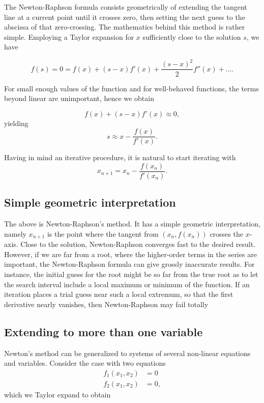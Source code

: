 \documentclass[%
oneside,                 %
final,                   %
10pt]{article}
\begin{document}
The Newton-Raphson formula consists geometrically of extending the
tangent line at a current point until it crosses zero, then setting
the next guess to the abscissa of that zero-crossing.  The mathematics
behind this method is rather simple. Employing a Taylor expansion for
$x$ sufficiently close to the solution $s$, we have


\[
    f(s)=0=f(x)+(s-x)f'(x)+\frac{(s-x)^2}{2}f''(x) +\dots.
    \label{eq:taylornr}
\]

For small enough values of the function and for well-behaved
functions, the terms beyond linear are unimportant, hence we obtain


\[
   f(x)+(s-x)f'(x)\approx 0,
\]
yielding
\[
   s\approx x-\frac{f(x)}{f'(x)}.
\]

Having in mind an iterative procedure, it is natural to start iterating with
\[
   x_{n+1}=x_n-\frac{f(x_n)}{f'(x_n)}.
\]

\subsection*{Simple geometric interpretation}

The above is Newton-Raphson's method. It has a simple geometric
interpretation, namely $x_{n+1}$ is the point where the tangent from
$(x_n,f(x_n))$ crosses the $x$-axis.  Close to the solution,
Newton-Raphson converges fast to the desired result. However, if we
are far from a root, where the higher-order terms in the series are
important, the Newton-Raphson formula can give grossly inaccurate
results. For instance, the initial guess for the root might be so far
from the true root as to let the search interval include a local
maximum or minimum of the function.  If an iteration places a trial
guess near such a local extremum, so that the first derivative nearly
vanishes, then Newton-Raphson may fail totally


\subsection*{Extending to more than one variable}

Newton's method can be generalized to systems of several non-linear equations
and variables. Consider the case with two equations
\[
   \begin{array}{cc} f_1(x_1,x_2) &=0\\
                     f_2(x_1,x_2) &=0,\end{array}
\]
which we Taylor expand to obtain
\end{document}
